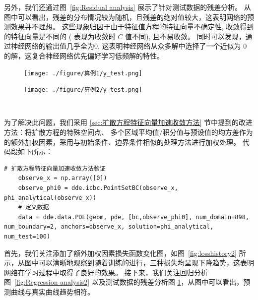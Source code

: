 \documentclass{Sichuan Normal University}
\begin{document}
另外，我们还通过图~\ref{fig:Residual analysis} 展示了针对测试数据的残差分析。
从图中可以看出，残差的分布情况较为随机，且残差的绝对值较大，这表明网络的预测效果并不理想。
这些现象归因于由于特征值方程的特征向量不确定性, 收敛得到的特征向量是不同的 ( 表现为收敛时 $C$ 值不同), 且不易收敛。
同时可以发现，通过神经网络的输出值几乎全为$0$, 这表明神经网络从众多解中选择了一个近似为 $0$ 的解，这复合神经网络优先偏好学习低频解的特性。

\begin{figure}[H]
    \centering
    \begin{minipage}[c]{0.48\textwidth}
    \centering
    \texttt{[image: ./figure/算例1/y\_test.png]}
    \end{minipage}
    \hspace{0.02\textwidth}
    \begin{minipage}[c]{0.48\textwidth}
    \centering
    \texttt{[image: ./figure/算例2/y\_test.png]}
    \end{minipage}\\[3mm]
    \begin{minipage}[t]{0.48\textwidth}
    \centering
    \label{fig:Residual analysis}
    \end{minipage}
    \hspace{0.02\textwidth}
    \begin{minipage}[t]{0.48\textwidth}
    \centering
    \label{fig:Residual analysis2}
    \end{minipage}
    \end{figure}

为了解决此问题，我们采用 \ref{sec:扩散方程特征向量加速收敛方法} 节中提到的改进方法：将扩散方程的特殊空间点、 多个区域平均值/积分值与预设值的均方差作为的额外加权因素，采用与初始条件、边界条件相似的处理方法进行加权处理。
代码段如下所示：
\begin{lstlisting}[style=python,basicstyle=\footnotesize\fontspec{Courier New},]  
    # 扩散方程特征向量加速收敛方法验证
    observe_x = np.array([0])
    observe_phi0 = dde.icbc.PointSetBC(observe_x, phi_analytical(observe_x))
    # 定义数据
    data = dde.data.PDE(geom, pde, [bc,observe_phi0], num_domain=898, num_boundary=2, anchors=observe_x, solution=phi_analytical, num_test=100)
\end{lstlisting}

首先，我们关注添加了额外加权因素损失函数变化图，如图~\ref{fig:losshistory2} 所示，从图中可以清晰地观察到随着训练的进行，三种损失均呈现下降趋势，这表明网络在学习过程中取得了良好的效果。
接下来，我们关注回归分析图~\ref{fig:Regression analysis2} 以及测试数据的残差分析图 \ref{fig:Residual analysis2}，从图中可以看出，预测曲线与真实曲线趋势相符。
\end{document}
